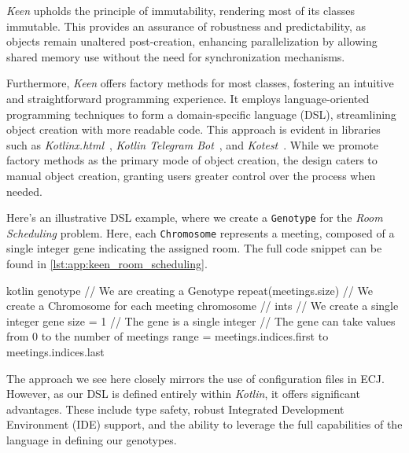     \textit{Keen} upholds the principle of immutability, rendering most of its classes immutable.
    This provides an assurance of robustness and predictability, as objects remain unaltered post-creation, enhancing parallelization by allowing shared memory use without the need for synchronization mechanisms.

    Furthermore, \textit{Keen} offers factory methods for most classes, fostering an intuitive and straightforward programming experience.
    It employs language-oriented programming techniques to form a domain-specific language (DSL), streamlining object creation with more readable code.
    This approach is evident in libraries such as \textit{Kotlinx.html}~\autocite{KotlinxHtml2023}, \textit{Kotlin Telegram Bot}~\autocite{KotlinTelegramBot2023}, and \textit{Kotest}~\autocite{KotestKotesta}.
    While we promote factory methods as the primary mode of object creation, the design caters to manual object creation, granting users greater control over the process when needed.


    Here's an illustrative DSL example, where we create a \texttt{Genotype} for the \textit{Room Scheduling} problem.
    Here, each \texttt{Chromosome} represents a meeting, composed of a single integer gene indicating the assigned room.
    The full code snippet can be found in \vref{lst:app:keen_room_scheduling}.

    \begin{code}[title={Usage of the \textit{Keen} Domain Specific Configuration Language (KDSCL)}]{kotlin}
        genotype {                  // We are creating a Genotype
            repeat(meetings.size) { // We create a Chromosome for each meeting
                chromosome {        //
                    ints {          // We create a single integer gene
                        size = 1    // The gene is a single integer
                        // The gene can take values from 0 to the number of meetings
                        range = meetings.indices.first to meetings.indices.last
                    }
                }
            }
        }
    \end{code}

    The approach we see here closely mirrors the use of configuration files in 
    ECJ.
    However, as our DSL is defined entirely within \textit{Kotlin}, it offers 
    significant advantages.
    These include type safety, robust Integrated Development Environment (IDE) 
    support, and the ability to leverage the full capabilities of the language 
    in defining our genotypes.


